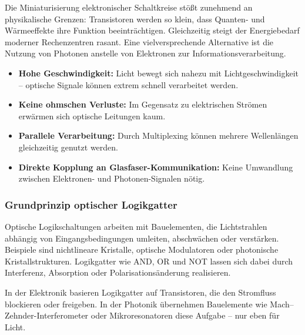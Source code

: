 Die Miniaturisierung elektronischer Schaltkreise stößt zunehmend an physikalische Grenzen: Transistoren werden so klein, dass Quanten- und Wärmeeffekte ihre Funktion beeinträchtigen. Gleichzeitig steigt der Energiebedarf moderner Rechenzentren rasant. Eine vielversprechende Alternative ist die Nutzung von Photonen anstelle von Elektronen zur Informationsverarbeitung.
\medskip
\begin{tcolorbox}[physikbox, title=Warum Photonen für Logikschaltungen interessant sind, label=box:optlogik_vorteile]
	\small
	\begin{itemize}
		\item \textbf{Hohe Geschwindigkeit:} Licht bewegt sich nahezu mit Lichtgeschwindigkeit – optische Signale können extrem schnell verarbeitet werden.
		\item \textbf{Keine ohmschen Verluste:} Im Gegensatz zu elektrischen Strömen erwärmen sich optische Leitungen kaum.
		\item \textbf{Parallele Verarbeitung:} Durch Multiplexing können mehrere Wellenlängen gleichzeitig genutzt werden.
		\item \textbf{Direkte Kopplung an Glasfaser-Kommunikation:} Keine Umwandlung zwischen Elektronen- und Photonen-Signalen nötig.
	\end{itemize}
\end{tcolorbox}

\subsubsection{Grundprinzip optischer Logikgatter}

Optische Logikschaltungen arbeiten mit Bauelementen, die Lichtstrahlen abhängig von Eingangsbedingungen umleiten, abschwächen oder verstärken. Beispiele sind nichtlineare Kristalle, optische Modulatoren oder photonische Kristallstrukturen.  
Logikgatter wie \textsc{AND}, \textsc{OR} und \textsc{NOT} lassen sich dabei durch Interferenz, Absorption oder Polarisationsänderung realisieren.
\medskip
\begin{tcolorbox}[didaktikbox, title=Von Elektronik zu Photonik]
	\label{box:optlogik_didaktik}
	\small
	In der Elektronik basieren Logikgatter auf Transistoren, die den Stromfluss blockieren oder freigeben. In der Photonik übernehmen Bauelemente wie Mach–Zehnder-Interferometer oder Mikroresonatoren diese Aufgabe – nur eben für Licht.
\end{tcolorbox}

